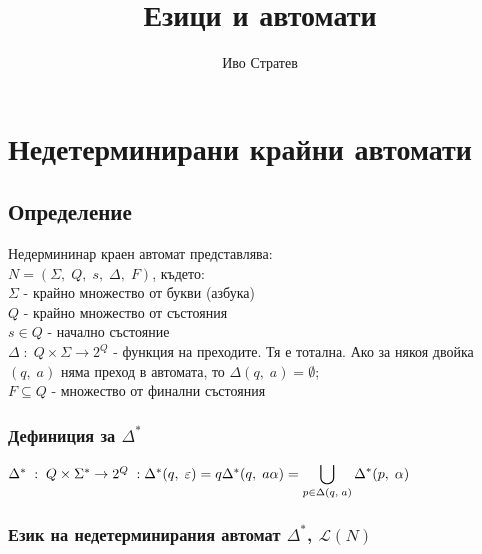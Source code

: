 \documentclass[12pt]{article}
\title{Езици и автомати}
\author{Иво Стратев}
\newcommand{\Lang}{\mathcal{L}}
\begin{document}
\maketitle

\section*{Недетерминирани крайни автомати}

\subsection*{Определение}

Недермининар краен автомат представлява: \\

$N = (\Sigma, \; Q, \; s, \; \Delta, \; F)$, където: \\

$\Sigma$ - крайно множество от букви (азбука) \\

$Q$ - крайно множество от състояния \\

$s \in Q$ - начално състояние \\

$\Delta \; : \; Q \times \Sigma \to 2^Q $ - функция на преходите. Тя е тотална. Ако за някоя двойка $(q, \; a)$ няма преход в автомата, то $\Delta(q, \; a) = \emptyset$; \\

$F \subseteq Q$ - множество от финални състояния \\

\subsubsection*{Дефиниция за $\Delta^*$}

$\Delta^* \; : \; Q\times\Sigma^* \to 2^Q \; : \; \\\\
\Delta^*(q, \; \varepsilon) = {q} \\\\
\Delta^*(q, \; a\alpha) = \displaystyle\bigcup_{p \in \Delta(q, \; a)} \Delta^*(p, \; \alpha) $

\subsubsection*{Език на недетерминирания автомат $\Delta^*$, $\Lang(N)$}
\end{document}
